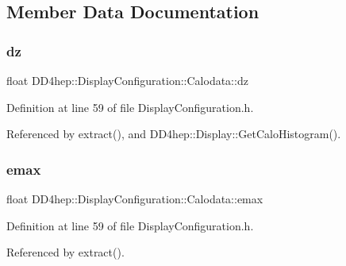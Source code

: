 \subsection{Member Data Documentation}
\hypertarget{struct_d_d4hep_1_1_display_configuration_1_1_calodata_add8df58585b1231290a12e7da2f2621f}{}\label{struct_d_d4hep_1_1_display_configuration_1_1_calodata_add8df58585b1231290a12e7da2f2621f} 
\subsubsection{\texorpdfstring{dz}{dz}}
{\footnotesize\ttfamily float D\+D4hep\+::\+Display\+Configuration\+::\+Calodata\+::dz}



Definition at line 59 of file Display\+Configuration.\+h.



Referenced by extract(), and D\+D4hep\+::\+Display\+::\+Get\+Calo\+Histogram().

\hypertarget{struct_d_d4hep_1_1_display_configuration_1_1_calodata_a471e0a91b9b45ba9b9917e1ef6d0bba8}{}\label{struct_d_d4hep_1_1_display_configuration_1_1_calodata_a471e0a91b9b45ba9b9917e1ef6d0bba8} 
\subsubsection{\texorpdfstring{emax}{emax}}
{\footnotesize\ttfamily float D\+D4hep\+::\+Display\+Configuration\+::\+Calodata\+::emax}



Definition at line 59 of file Display\+Configuration.\+h.



Referenced by extract().

\hypertarget{struct_d_d4hep_1_1_display_configuration_1_1_calodata_ac4cd456a1e2d56e753b3c298f1c864b0}{}\label{struct_d_d4hep_1_1_display_configuration_1_1_calodata_ac4cd456a1e2d56e753b3c298f1c864b0} 
